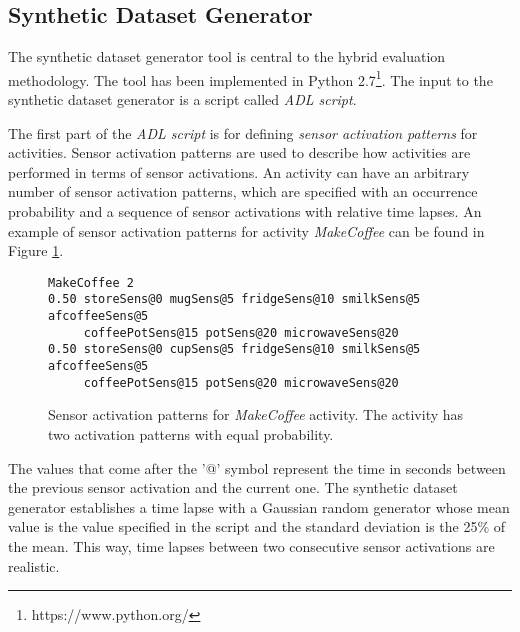 \subsection{Synthetic Dataset Generator}
\begin{comment}
 - Explain the script: sensor activation patterns, activity patterns (sequences and alterations), sensor positive noise
 - Explain probabilistic sensor modelling
 - Explain probabilistic time lapses
 - Show output examples and give numbers
\end{comment}
The synthetic dataset generator tool is central to the hybrid evaluation methodology. The tool has been implemented in Python 2.7\footnote{https://www.python.org/}. The input to the synthetic dataset generator is a script called \textit{ADL script}. 

The first part of the \textit{ADL script} is for defining \textit{sensor activation patterns} for activities. Sensor activation patterns are used to describe how activities are performed in terms of sensor activations. An activity can have an arbitrary number of sensor activation patterns, which are specified with an occurrence probability and a sequence of sensor activations with relative time lapses. An example of sensor activation patterns for activity \textit{MakeCoffee} can be found in Figure \ref{fig:sensor-act}.

\begin{figure}
\begin{small}
\begin{lstlisting}
MakeCoffee 2
0.50 storeSens@0 mugSens@5 fridgeSens@10 smilkSens@5 afcoffeeSens@5 
     coffeePotSens@15 potSens@20 microwaveSens@20
0.50 storeSens@0 cupSens@5 fridgeSens@10 smilkSens@5 afcoffeeSens@5 
     coffeePotSens@15 potSens@20 microwaveSens@20
\end{lstlisting}
\end{small}
\caption{Sensor activation patterns for \textit{MakeCoffee} activity. The activity has two activation patterns with equal probability.}
\label{fig:sensor-act}
\end{figure}

The values that come after the '@' symbol represent the time in seconds between the previous sensor activation and the current one. The synthetic dataset generator establishes a time lapse with a Gaussian random generator whose mean value is the value specified in the script and the standard deviation is the 25\% of the mean. This way, time lapses between two consecutive sensor activations are realistic. 

